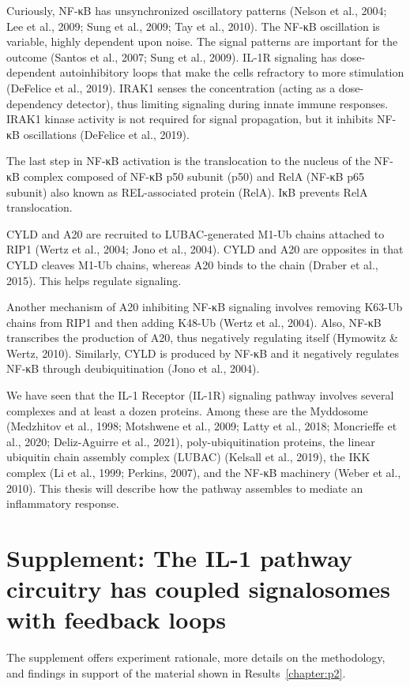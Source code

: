 Curiously, NF-κB has unsynchronized oscillatory patterns (Nelson et al., 2004; Lee et al., 2009; Sung et al., 2009; Tay et al., 2010). The NF-κB oscillation is variable, highly dependent upon noise. The signal patterns are important for the outcome (Santos et al., 2007; Sung et al., 2009). IL-1R signaling has dose-dependent autoinhibitory loops that make the cells refractory to more stimulation (DeFelice et al., 2019). IRAK1 senses the concentration (acting as a dose-dependency detector), thus limiting signaling during innate immune responses. IRAK1 kinase activity is not required for signal propagation, but it inhibits NF-κB oscillations (DeFelice et al., 2019).

The last step in NF-κB activation is the translocation to the nucleus of the NF-κB complex composed of NF-κB p50 subunit (p50) and RelA (NF-κB p65 subunit) also known as REL-associated protein (RelA). IκB prevents RelA translocation.

CYLD and A20 are recruited to LUBAC-generated M1-Ub chains attached to RIP1 (Wertz et al., 2004; Jono et al., 2004). CYLD and A20 are opposites in that CYLD cleaves M1-Ub chains, whereas A20 binds to the chain (Draber et al., 2015). This helps regulate signaling.

Another mechanism of A20 inhibiting NF-κB signaling involves removing K63-Ub chains from RIP1 and then adding K48-Ub (Wertz et al., 2004). Also, NF-κB transcribes the production of A20, thus negatively regulating itself (Hymowitz \& Wertz, 2010). Similarly, CYLD is produced by NF-κB and it negatively regulates NF-κB through deubiquitination (Jono et al., 2004).

We have seen that the IL-1 Receptor (IL-1R) signaling pathway involves several complexes and at least a dozen proteins. Among these are the Myddosome (Medzhitov et al., 1998; Motshwene et al., 2009; Latty et al., 2018; Moncrieffe et al., 2020; Deliz-Aguirre et al., 2021), poly-ubiquitination proteins, the linear ubiquitin chain assembly complex (LUBAC) (Kelsall et al., 2019), the IKK complex (Li et al., 1999; Perkins, 2007), and the NF-κB machinery (Weber et al., 2010). This thesis will describe how the pathway assembles to mediate an inflammatory response.

\chapter{Supplement: The IL-1 pathway circuitry has coupled signalosomes with feedback loops}
The supplement offers experiment rationale, more details on the methodology, and findings in support of the material shown in Results~\ref{chapter:p2}.


